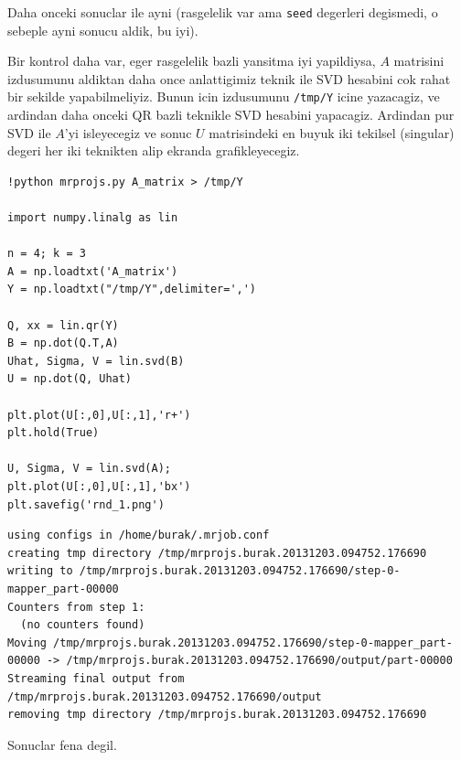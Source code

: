 \documentclass[12pt,fleqn]{article}\usepackage{../common}
\begin{document}
Daha onceki sonuclar ile ayni (rasgelelik var ama \verb!seed!
degerleri degismedi, o sebeple ayni sonucu aldik, bu iyi).

Bir kontrol daha var, eger rasgelelik bazli yansitma iyi yapildiysa, $A$
matrisini izdusumunu aldiktan daha once anlattigimiz teknik ile SVD
hesabini cok rahat bir sekilde yapabilmeliyiz. Bunun icin izdusumunu
\verb!/tmp/Y! icine yazacagiz, ve ardindan daha onceki QR bazli
teknikle SVD hesabini yapacagiz. Ardindan pur SVD ile $A$'yi isleyecegiz ve
sonuc $U$ matrisindeki en buyuk iki tekilsel (singular) degeri her iki
teknikten alip ekranda grafikleyecegiz.

\begin{verbatim}
!python mrprojs.py A_matrix > /tmp/Y

import numpy.linalg as lin

n = 4; k = 3
A = np.loadtxt('A_matrix')
Y = np.loadtxt("/tmp/Y",delimiter=',')

Q, xx = lin.qr(Y)
B = np.dot(Q.T,A)
Uhat, Sigma, V = lin.svd(B)
U = np.dot(Q, Uhat)

plt.plot(U[:,0],U[:,1],'r+')
plt.hold(True)

U, Sigma, V = lin.svd(A);
plt.plot(U[:,0],U[:,1],'bx')
plt.savefig('rnd_1.png')
\end{verbatim}

\begin{verbatim}
using configs in /home/burak/.mrjob.conf
creating tmp directory /tmp/mrprojs.burak.20131203.094752.176690
writing to /tmp/mrprojs.burak.20131203.094752.176690/step-0-mapper_part-00000
Counters from step 1:
  (no counters found)
Moving /tmp/mrprojs.burak.20131203.094752.176690/step-0-mapper_part-00000 -> /tmp/mrprojs.burak.20131203.094752.176690/output/part-00000
Streaming final output from /tmp/mrprojs.burak.20131203.094752.176690/output
removing tmp directory /tmp/mrprojs.burak.20131203.094752.176690
\end{verbatim}

Sonuclar fena degil.
\end{document}
